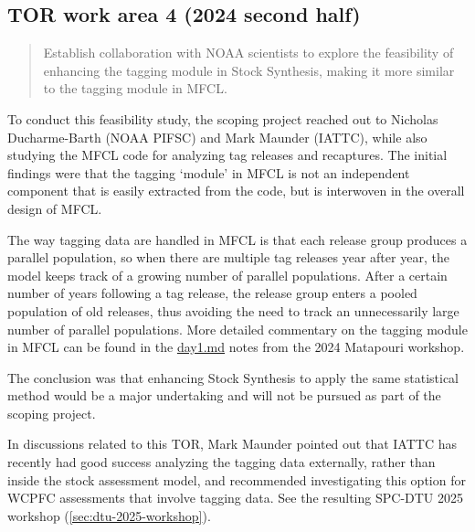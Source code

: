 \documentclass{SCreport}
\newcommand\blob
{https://github.com/PacificCommunity/ofp-sam-transition-plan/blob/main}
\begin{document}
\vspace{2ex}

\hypertarget{link:tor-4}{}
\subsection{TOR work area 4 (2024 second half)}
\label{sec:tor-4}

\begin{quote}\sf
  Establish collaboration with NOAA scientists to explore the feasibility of
  enhancing the tagging module in Stock Synthesis, making it more similar to the
  tagging module in MFCL.
\end{quote}

\vspace{2ex}

To conduct this feasibility study, the scoping project reached out to Nicholas
Ducharme-Barth (NOAA PIFSC) and Mark Maunder (IATTC), while also studying the
MFCL code for analyzing tag releases and recaptures. The initial findings were
that the tagging `module' in MFCL is not an independent component that is easily
extracted from the code, but is interwoven in the overall design of MFCL.

The way tagging data are handled in MFCL is that each release group produces a
parallel population, so when there are multiple tag releases year after year,
the model keeps track of a growing number of parallel populations. After a
certain number of years following a tag release, the release group enters a
pooled population of old releases, thus avoiding the need to track an
unnecessarily large number of parallel populations. More detailed commentary on
the tagging module in MFCL can be found in the
\href{\blob/workshops/2024-08-matapouri/notes/day1.md}{day1.md} notes from the
2024 Matapouri workshop.

The conclusion was that enhancing Stock Synthesis to apply the same statistical
method would be a major undertaking and will not be pursued as part of the
scoping project.

In discussions related to this TOR, Mark Maunder pointed out that IATTC has
recently had good success analyzing the tagging data externally, rather than
inside the stock assessment model, and recommended investigating this option for
WCPFC assessments that involve tagging data. See the resulting SPC-DTU 2025
workshop (\autoref{sec:dtu-2025-workshop}).

\vspace{2ex}
\end{document}
